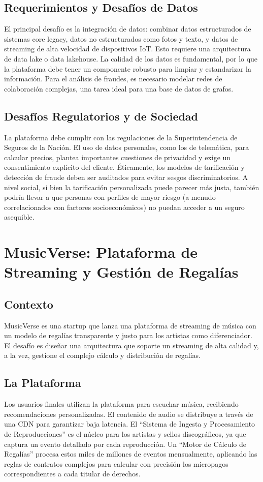 \documentclass[12pt]{article}
\begin{document}
\subsection{Requerimientos y Desafíos de Datos}
El principal desafío es la integración de datos: combinar datos estructurados de sistemas core legacy, datos no estructurados como fotos y texto, y datos de streaming de alta velocidad de dispositivos IoT. Esto requiere una arquitectura de data lake o data lakehouse. La calidad de los datos es fundamental, por lo que la plataforma debe tener un componente robusto para limpiar y estandarizar la información. Para el análisis de fraudes, es necesario modelar redes de colaboración complejas, una tarea ideal para una base de datos de grafos.

\subsection{Desafíos Regulatorios y de Sociedad}
La plataforma debe cumplir con las regulaciones de la Superintendencia de Seguros de la Nación. El uso de datos personales, como los de telemática, para calcular precios, plantea importantes cuestiones de privacidad y exige un consentimiento explícito del cliente. Éticamente, los modelos de tarificación y detección de fraude deben ser auditados para evitar sesgos discriminatorios. A nivel social, si bien la tarificación personalizada puede parecer más justa, también podría llevar a que personas con perfiles de mayor riesgo (a menudo correlacionados con factores socioeconómicos) no puedan acceder a un seguro asequible.

\newpage

\section{MusicVerse: Plataforma de Streaming y Gestión de Regalías}

\subsection{Contexto}
MusicVerse es una startup que lanza una plataforma de streaming de música con un modelo de regalías transparente y justo para los artistas como diferenciador. El desafío es diseñar una arquitectura que soporte un streaming de alta calidad y, a la vez, gestione el complejo cálculo y distribución de regalías.

\subsection{La Plataforma}
Los usuarios finales utilizan la plataforma para escuchar música, recibiendo recomendaciones personalizadas. El contenido de audio se distribuye a través de una CDN para garantizar baja latencia. El ``Sistema de Ingesta y Procesamiento de Reproducciones'' es el núcleo para los artistas y sellos discográficos, ya que captura un evento detallado por cada reproducción. Un ``Motor de Cálculo de Regalías'' procesa estos miles de millones de eventos mensualmente, aplicando las reglas de contratos complejos para calcular con precisión los micropagos correspondientes a cada titular de derechos.
\end{document}
